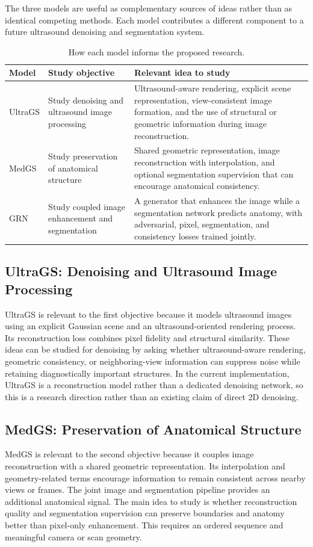 \documentclass[11pt,a4paper]{article}
\begin{document}
The three models are useful as complementary sources of ideas rather than as identical competing methods. Each model contributes a different component to a future ultrasound denoising and segmentation system.

\begin{table}[h]
\centering
\caption{How each model informs the proposed research.}
\begin{tabular}{p{} p{} p{}}
\toprule
Model & Study objective & Relevant idea to study \\
\midrule
UltraGS & Study denoising and ultrasound image processing & Ultrasound-aware rendering, explicit scene representation, view-consistent image formation, and the use of structural or geometric information during image reconstruction. \\
MedGS & Study preservation of anatomical structure & Shared geometric representation, image reconstruction with interpolation, and optional segmentation supervision that can encourage anatomical consistency. \\
GRN & Study coupled image enhancement and segmentation & A generator that enhances the image while a segmentation network predicts anatomy, with adversarial, pixel, segmentation, and consistency losses trained jointly. \\
\bottomrule
\end{tabular}
\end{table}

\subsection{UltraGS: Denoising and Ultrasound Image Processing}
UltraGS is relevant to the first objective because it models ultrasound images using an explicit Gaussian scene and an ultrasound-oriented rendering process. Its reconstruction loss combines pixel fidelity and structural similarity. These ideas can be studied for denoising by asking whether ultrasound-aware rendering, geometric consistency, or neighboring-view information can suppress noise while retaining diagnostically important structures. In the current implementation, UltraGS is a reconstruction model rather than a dedicated denoising network, so this is a research direction rather than an existing claim of direct 2D denoising.

\subsection{MedGS: Preservation of Anatomical Structure}
MedGS is relevant to the second objective because it couples image reconstruction with a shared geometric representation. Its interpolation and geometry-related terms encourage information to remain consistent across nearby views or frames. The joint image and segmentation pipeline provides an additional anatomical signal. The main idea to study is whether reconstruction quality and segmentation supervision can preserve boundaries and anatomy better than pixel-only enhancement. This requires an ordered sequence and meaningful camera or scan geometry.
\end{document}

